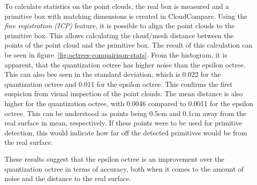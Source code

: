 To calculate statistics on the point clouds, the real box is measured and a primitive box with matching dimensions is created in CloudCompare.
Using the \textit{fine registration (ICP)} feature, it is possible to align the point clouds to the primitive box.
This allows calculating the cloud/mesh distance between the points of the point cloud and the primitive box.
The result of this calculation can be seen in figure~\ref{fig:octrees-compairison-stats}.
From the histogram, it is apparent, that the quantization octree has higher noise than the epsilon octree.
This can also bee seen in the standard deviation, which is 0.022 for the quantization octree and 0.011
for the epsilon octree.
This confirms the first suspicion from visual inspection of the point clouds.
The mean distance is also higher for the quantization octree, with 0.0046 compared to 0.0011 for the epsilon octree.
This can be understood as points being 0.5cm and 0.1cm away from the real surface in mean, respectively.
If these points were to be used for primitive detection, this would indicate how far off the detected primitives would be from the real surface.

These results suggest that the epsilon octree is an improvement over the quantization octree in terms of accuracy,
both when it comes to the amount of noise and the distance to the real surface.

